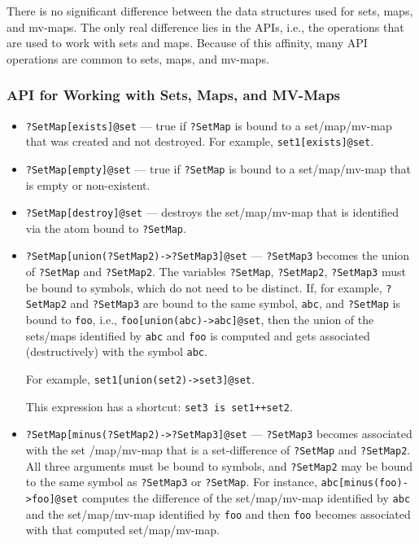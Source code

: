 There is no significant difference between the data structures used for
sets, maps,
and mv-maps. The only real difference lies in the APIs, i.e., the
operations that are used to work with sets and maps. Because of this affinity,
many API operations are common to
sets, maps, and mv-maps.

\subsubsection{API for Working with Sets, Maps, and MV-Maps}
\label{sec-api-set-map}

\begin{itemize}
\item  \texttt{?SetMap[exists]@\bs{}set} --- true if \texttt{?SetMap} is bound to
  a set/map/mv-map that was created and not destroyed.
  For example, \texttt{set1[exists]@\bs{}set}. 
\item \texttt{?SetMap[empty]@\bs{}set} --- true if \texttt{?SetMap} is bound to
  a set/map/mv-map that is empty or non-existent.
\item \texttt{?SetMap[destroy]@\bs{}set} --- destroys the set/map/mv-map that is
  identified via the atom bound to \texttt{?SetMap}.
\item \texttt{?SetMap[union(?SetMap2)->?SetMap3]@\bs{}set} --- \texttt{?SetMap3}
  becomes the union of \texttt{?SetMap} and \texttt{?SetMap2}. The variables
  \texttt{?SetMap}, \texttt{?SetMap2}, \texttt{?SetMap3} must be bound to symbols,
  which do not need to be distinct.
  If, for example, \texttt{?SetMap2} and \texttt{?SetMap3} are bound to the same
  symbol, \texttt{abc}, and \texttt{?SetMap} is bound to \texttt{foo},
  i.e., \texttt{foo[union(abc)->abc]@\bs{}set}, then the
  union of the sets/maps identified by \texttt{abc} and \texttt{foo} is
  computed and gets associated (destructively) with the symbol
  \texttt{abc}.

  For example, \texttt{set1[union(set2)->set3]@\bs{}set}. 

  This expression has a shortcut:  \texttt{set3 \bs{}is set1++set2}.   

\item \texttt{?SetMap[minus(?SetMap2)->?SetMap3]@\bs{}set} --- \texttt{?SetMap3}
  becomes associated with the set /map/mv-map that is a set-difference of \texttt{?SetMap}
  and \texttt{?SetMap2}. All three arguments must be bound to symbols, and
  \texttt{?SetMap2} may be bound to the same symbol as \texttt{?SetMap3} or
  \texttt{?SetMap}. For instance, \texttt{abc[minus(foo)->foo]@\bs{}set}      
  computes the difference of the set/map/mv-map identified by \texttt{abc} and the
  set/map/mv-map identified by \texttt{foo} and then \texttt{foo} becomes associated
  with that computed set/map/mv-map.


\end{itemize}
